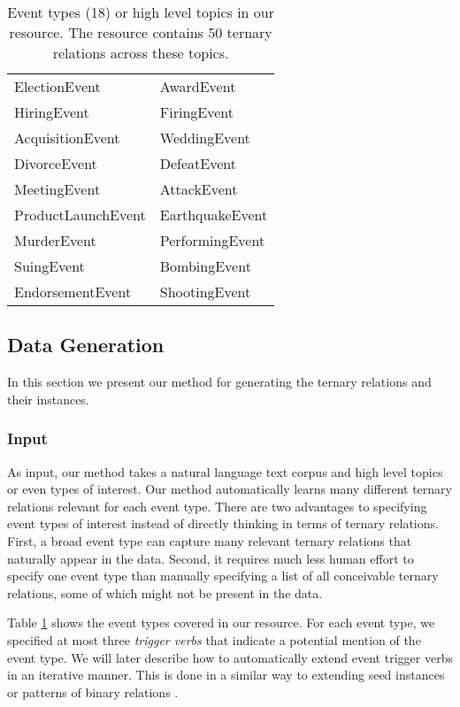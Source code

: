   \begin{table}[t]
  \begin{tabular}{|l|l|}
  \hline
  ElectionEvent & AwardEvent \\
  HiringEvent & FiringEvent \\
  AcquisitionEvent & WeddingEvent \\
  DivorceEvent & DefeatEvent \\
  MeetingEvent & AttackEvent \\
  ProductLaunchEvent & EarthquakeEvent \\
  MurderEvent & PerformingEvent \\
  SuingEvent & BombingEvent \\
  EndorsementEvent & ShootingEvent \\
  \hline
  \end{tabular}
  \caption{Event types (18) or high level topics in our resource.  The resource contains 50 ternary relations across these topics.}
  \label{eventtypes}
  \end{table}
  
 \subsection{Data Generation}
In this section we present our method for generating the ternary relations and their instances.

\subsubsection{Input}
As input, our method takes a natural language text corpus and   high level topics or even types of interest. Our method automatically learns many different ternary relations relevant for each event type. There are two advantages to  specifying event types of interest instead of directly thinking in terms of  ternary relations.  First, a broad event type can capture many relevant ternary relations that naturally appear in the data. Second, it requires much less human effort to specify one event type than manually specifying a list of all conceivable  ternary relations, some of which might not be present in the data.

Table \ref{eventtypes} shows the event types covered in our resource. For each event type, we specified at most three \textit{trigger verbs} that indicate a potential mention of the event type. We will later describe how to automatically extend  event trigger verbs in an iterative manner. This is done in a similar way to extending seed instances or patterns of  binary relations \cite{Suchanek:2009,Nakashole2011,MitchellCHTBCMG15}.



